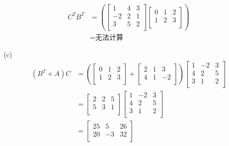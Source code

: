 \documentclass{article}
\begin{document}
\begin{align*}
    C^TB^T &=
    \left(
        \begin{bmatrix}
            1 & 4 & 3\\
            -2 & 2 & 1\\
            3 & 5 & 2\\
        \end{bmatrix}
        \begin{bmatrix}
            0 & 1 & 2\\
            1 & 2 & 3\\
        \end{bmatrix}
    \right)\\
    &= \text{无法计算}
\end{align*}

(c)
\begin{align*}
    (B^T+A)C &=
    \left(
    \begin{bmatrix}
        0 & 1 & 2\\
        1 & 2 & 3\\
    \end{bmatrix}
    +
    \begin{bmatrix}
        2 & 1 & 3\\
        4 & 1 & -2\\
    \end{bmatrix}
    \right)
    \begin{bmatrix}
        1 & -2 & 3\\
        4 & 2 & 5\\
        3 & 1 & 2\\
    \end{bmatrix}\\
    &=
    \begin{bmatrix}
        2 & 2 & 5\\
        5 & 3 & 1\\
    \end{bmatrix}
    \begin{bmatrix}
        1 & -2 & 3\\
        4 & 2 & 5\\
        3 & 1 & 2\\
    \end{bmatrix}\\
    &=
    \begin{bmatrix}
        25 & 5 & 26\\
        20 & -3 & 32\\
    \end{bmatrix}
\end{align*}
\end{document}
